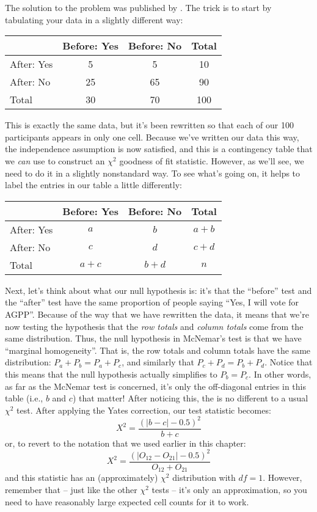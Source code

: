 The solution to the problem was published by \textcite{McNemar1947}. The trick is to start by tabulating your data in a slightly different way:
\begin{center}
\begin{tabular}{l|cc|c}
& Before: Yes & Before: No & Total \\ \hline
After: Yes   & 5 & 5 & 10 \\
After: No    & 25 & 65 & 90 \\ \hline
Total        & 30 & 70 & 100
\end{tabular}
\end{center}
\noindent
This is exactly the same data, but it's been rewritten so that each of our 100 participants appears in only one cell. Because we've written our data this way, the independence assumption is now satisfied, and this is a contingency table that we {\it can} use to construct an $\chi^2$ goodness of fit statistic. However, as we'll see, we need to do it in a slightly nonstandard way. To see what's going on, it helps to label the entries in our table a little differently:
\begin{center}
\begin{tabular}{l|cc|c}
& Before: Yes & Before: No & Total \\ \hline
After: Yes   & $a$ & $b$ & $a+b$ \\
After: No & $c$ & $d$ & $c+d$ \\ \hline
Total & $a+c$ & $b+d$ & $n$
\end{tabular}
\end{center}
\noindent
Next, let's think about what our null hypothesis is: it's that the ``before'' test and the ``after'' test have the same proportion of people saying ``Yes, I will vote for AGPP''. Because of the way that we have rewritten the data, it means that we're now testing the hypothesis that the {\it row totals} and {\it column totals} come from the same distribution. Thus, the null hypothesis in McNemar's test is that we have ``marginal homogeneity''. That is, the row totals and column totals have the same distribution: $P_a + P_b = P_a + P_c$, and similarly that $P_c + P_d = P_b + P_d$. Notice that this means that the null hypothesis actually simplifies to $P_b = P_c$. In other words, as far as the McNemar test is concerned, it's only the off-diagonal entries in this table (i.e., $b$ and $c$) that matter! After noticing this, the  is no different to a usual $\chi^2$ test. After applying the Yates correction, our test statistic becomes:
$$
X^2 = \frac{(|b-c| - 0.5)^2}{b+c}
$$
or, to revert to the notation that we used earlier in this chapter:
$$
X^2 = \frac{(|O_{12}-O_{21}| - 0.5)^2}{O_{12} + O_{21}}
$$
and this statistic has an (approximately) $\chi^2$ distribution with $df=1$. However, remember that -- just like the other $\chi^2$ tests -- it's only an approximation, so you need to have reasonably large expected cell counts for it to work.


